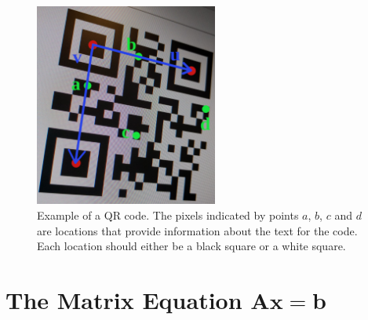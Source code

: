 \begin{exercise}
  \begin{figure}[h]
    \centering
      \includegraphics[width=6cm]{img/qrCodeSnapshotUV-points.png}
    \caption{Example of a QR code. The pixels indicated by points $a$,
    $b$, $c$ and $d$ are locations that provide information about the
    text for the code. Each location should either be a black square
    or a white square.}
    \label{fig:qrCodeExampleLocations}
  \end{figure}

\end{exercise}


\newpage


\section{The Matrix Equation $\boldsymbol{Ax=b}$}
\name[2.25in]

